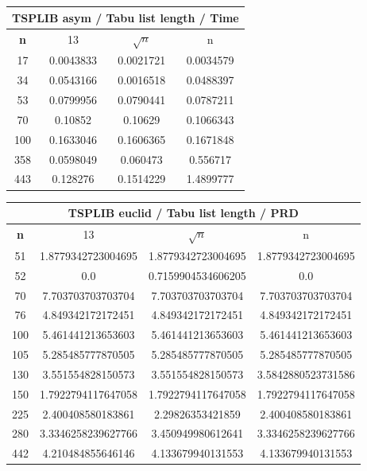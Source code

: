 \documentclass{article}
\begin{document}
\begin{center}
\begin{tabular}{|c|c|c|c|}
\hline
\multicolumn{4}{|c|}{\textbf{TSPLIB asym / Tabu list length / Time}}\\
\hline
\textbf{n} & 13 & $\sqrt{n}$ & n\\
\hline
17 & 0.0043833 & 0.0021721 & 0.0034579\\
\hline
34 & 0.0543166 & 0.0016518 & 0.0488397\\
\hline
53 & 0.0799956 & 0.0790441 & 0.0787211\\
\hline
70 & 0.10852 & 0.10629 & 0.1066343\\
\hline
100 & 0.1633046 & 0.1606365 & 0.1671848\\
\hline
358 & 0.0598049 & 0.060473 & 0.556717\\
\hline
443 & 0.128276 & 0.1514229 & 1.4899777\\
\hline
\end{tabular}
\end{center}


\begin{center}
\begin{tabular}{|c|c|c|c|}
\hline
\multicolumn{4}{|c|}{\textbf{TSPLIB euclid / Tabu list length / PRD}}\\
\hline
\textbf{n} & 13 & $\sqrt{n}$ & n\\
\hline
51 & 1.8779342723004695 & 1.8779342723004695 & 1.8779342723004695\\
\hline
52 & 0.0 & 0.7159904534606205 & 0.0\\
\hline
70 & 7.703703703703704 & 7.703703703703704 & 7.703703703703704\\
\hline
76 & 4.849342172172451 & 4.849342172172451 & 4.849342172172451\\
\hline
100 & 5.461441213653603 & 5.461441213653603 & 5.461441213653603\\
\hline
105 & 5.285485777870505 & 5.285485777870505 & 5.285485777870505\\
\hline
130 & 3.551554828150573 & 3.551554828150573 & 3.5842880523731586\\
\hline
150 & 1.7922794117647058 & 1.7922794117647058 & 1.7922794117647058\\
\hline
225 & 2.400408580183861 & 2.29826353421859 & 2.400408580183861\\
\hline
280 & 3.3346258239627766 & 3.450949980612641 & 3.3346258239627766\\
\hline
442 & 4.210484855646146 & 4.133679940131553 & 4.133679940131553\\
\hline
\end{tabular}
\end{center}
\end{document}

